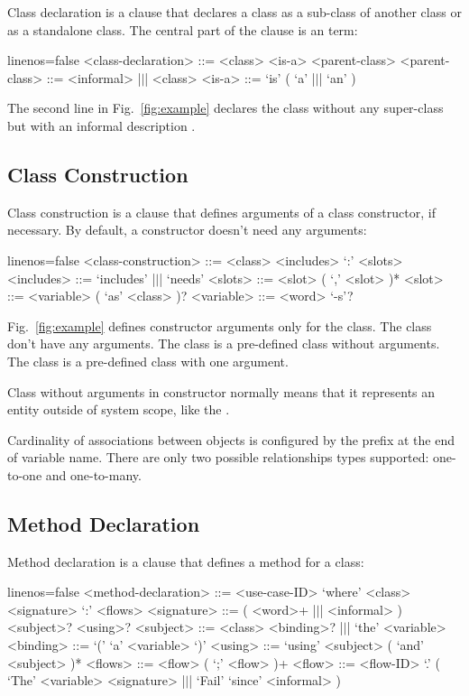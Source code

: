 \documentclass[sigplan,10pt,nonacm=true]{acmart}
\begin{document}
Class declaration is a clause that declares a class as a sub-class of
another class or as a standalone class. The central part of the clause is
an  term:

\begin{ffcode*}{linenos=false}
<class-declaration> ::= <class>
  <is-a> <parent-class>
<parent-class> ::= <informal> |$\vert$| <class>
<is-a> ::= `is' ( `a' |$\vert$| `an' )
\end{ffcode*}

The second line in Fig.~\ref{fig:example} declares the class 
without any super-class but with an informal description
.

\subsection{Class Construction}

Class construction is a clause that defines arguments of a class
constructor, if necessary. By default, a constructor doesn't need any
arguments:

\begin{ffcode*}{linenos=false}
<class-construction> ::= <class> <includes>
  `:' <slots>
<includes> ::= `includes' |$\vert$| `needs'
<slots> ::= <slot> ( `,' <slot> )*
<slot> ::= <variable> ( `as' <class> )?
<variable> ::= <word> `-s'?
\end{ffcode*}

Fig.~\ref{fig:example} defines constructor arguments only for
the  class. The class  don't have any arguments. The class
 is a pre-defined class without arguments. The class  is a
pre-defined class with one argument.

Class without arguments in constructor normally means that it represents an
entity outside of system scope, like the .

Cardinality of associations between objects is configured by the 
prefix at the end of variable name. There are only
two possible relationships types supported: one-to-one and one-to-many.

\subsection{Method Declaration}

Method declaration is a clause that defines a method for a class:

\begin{ffcode*}{linenos=false}
<method-declaration> ::= <use-case-ID> `where'
<class> <signature> `:' <flows>
<signature> ::= ( <word>+ |$\vert$| <informal> )
  <subject>? <using>?
<subject> ::= <class> <binding>?
  |$\vert$| `the' <variable>
<binding> ::= `(' `a' <variable> `)'
<using> ::= `using' <subject>
  ( `and' <subject> )*
<flows> ::= <flow> ( `;' <flow> )+
<flow> ::= <flow-ID> `.'
  (
    `The' <variable> <signature>
    |$\vert$|
    `Fail' `since' <informal>
  )
\end{ffcode*}
\end{document}
